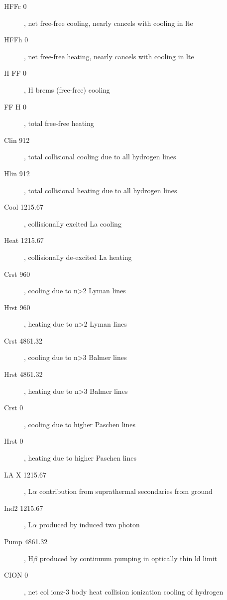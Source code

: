 \begin{description}
\item[HFFc    0], net free-free cooling, nearly cancels with cooling in lte

\item[HFFh   0], net free-free heating, nearly cancels with cooling in lte

\item[H FF   0], H brems (free-free) cooling

\item[FF H    0], total free-free heating

\item[Clin  912], total collisional cooling due to all hydrogen lines

\item[Hlin  912], total collisional heating due to all hydrogen lines

\item[Cool 1215.67], collisionally excited La cooling

\item[Heat 1215.67], collisionally de-excited La heating

\item[Crst  960], cooling due to n>2 Lyman lines

\item[Hrst  960], heating due to n>2 Lyman lines

\item[Crst 4861.32], cooling due to n>3 Balmer lines

\item[Hrst 4861.32], heating due to n>3 Balmer lines

\item[Crst    0], cooling due to higher Paschen lines

\item[Hrst    0], heating due to higher Paschen lines

\item[LA X 1215.67], L$\alpha $ contribution from suprathermal secondaries from ground

\item[Ind2 1215.67], L$\alpha $ produced by induced two photon

\item[Pump 4861.32], H$\beta$ produced by continuum pumping in optically thin ld limit

\item[CION    0], net col ionz-3 body heat collision ionization cooling of
hydrogen


\end{description}
